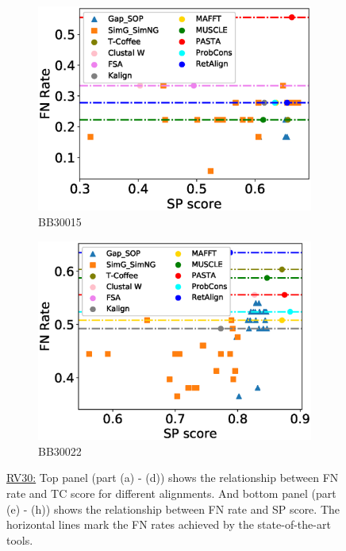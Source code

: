 \begin{figure}[!htbp]
\begin{adjustwidth}{-1cm}{-1cm}
\begin{subfigure}{0.22\textwidth}
			\includegraphics[width=\columnwidth]{Figure/summary/precomputedInit/Balibase/BB30015_fnrate_vs_sp_2}
			\caption{BB30015}
		\end{subfigure}
		\begin{subfigure}{0.22\textwidth}
			\includegraphics[width=\columnwidth]{Figure/summary/precomputedInit/Balibase/BB30022_fnrate_vs_sp_2}
			\caption{BB30022}
		\end{subfigure}	
		\end{adjustwidth}
		\caption[FN rate vs TC score on RV30]{\underline{RV30:} Top panel (part (a) - (d)) shows the relationship between FN rate and TC score for different alignments. And bottom panel (part (e) - (h)) shows the relationship between FN rate and SP score. The horizontal lines mark the FN rates achieved by the state-of-the-art tools.}
		\label{fig:rv30_fnrate_vs_tc}

\end{figure}

